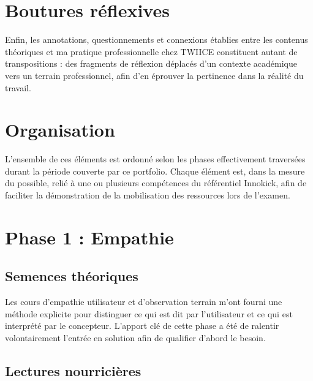 \section{Boutures réflexives}

Enfin, les annotations, questionnements et connexions établies entre les contenus théoriques et ma pratique professionnelle chez TWIICE constituent autant de transpositions : des fragments de réflexion déplacés d'un contexte académique vers un terrain professionnel, afin d'en éprouver la pertinence dans la réalité du travail.

\section{Organisation}

L'ensemble de ces éléments est ordonné selon les phases effectivement traversées durant la période couverte par ce portfolio. Chaque élément est, dans la mesure du possible, relié à une ou plusieurs compétences du référentiel Innokick, afin de faciliter la démonstration de la mobilisation des ressources lors de l'examen.

\section{Phase 1 : Empathie}


\subsection{Semences théoriques}

Les cours d'empathie utilisateur et d'observation terrain m'ont fourni une méthode explicite pour distinguer ce qui est dit par l'utilisateur et ce qui est interprété par le concepteur. L'apport clé de cette phase a été de ralentir volontairement l'entrée en solution afin de qualifier d'abord le besoin.

\subsection{Lectures nourricières}

